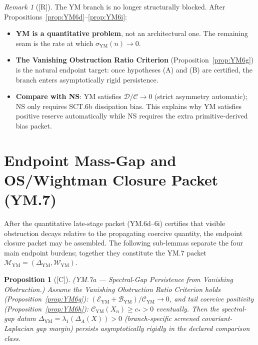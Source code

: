 \documentclass[12pt,oneside]{amsbook}
\theoremstyle{plain}
\newtheorem{proposition}[theorem]{Proposition}
\theoremstyle{definition}
\theoremstyle{remark}
\newtheorem{remark}[theorem]{Remark}
\newcommand{\status}[1]{\textup{[#1]}}
\begin{document}
\begin{remark}[\status{R}]\label{rem:YM-quantitative-summary}
The YM branch is no longer structurally blocked. After
Propositions~\ref{prop:YM6d}--\ref{prop:YM6i}:
\begin{itemize}
 \item \textbf{YM is a quantitative problem}, not an architectural
 one. The remaining seam is the rate at which
 $\sigma_{\mathrm{YM}}(n) \to 0$.
 \item \textbf{The Vanishing Obstruction Ratio Criterion}
 (Proposition~\ref{prop:YM6g}) is the natural endpoint target:
 once hypotheses (A) and (B) are certified, the branch enters
 asymptotically rigid persistence.
 \item \textbf{Compare with NS}: YM satisfies
 $\mathcal{D}/\mathcal{C} \to 0$ (strict asymmetry automatic);
 NS only requires SCT.6b dissipation bias. This explains why YM
 satisfies positive reserve automatically while NS requires the
 extra primitive-derived bias packet.
\end{itemize}
\end{remark}

\section{Endpoint Mass-Gap and OS/Wightman Closure Packet (YM.7)}
\label{sec:YM-endpoint}

After the quantitative late-stage packet (YM.6d--6i) certifies that
visible obstruction decays relative to the propagating coercive
quantity, the endpoint closure packet may be assembled. The following
sub-lemmas separate the four main endpoint burdens; together they
constitute the YM.7 packet
$\mathcal{M}_{\mathrm{YM}} = (\Delta_{\mathrm{YM}}, \mathcal{W}_{\mathrm{YM}})$.

\begin{proposition}[\status{C}]\label{prop:YM7a}
\textup{(YM.7a --- Spectral-Gap Persistence from Vanishing Obstruction.)}
Assume the Vanishing Obstruction Ratio Criterion holds
(Proposition~\ref{prop:YM6g}): $(\mathcal{E}_{\mathrm{YM}} +
\mathcal{B}_{\mathrm{YM}})/\mathcal{C}_{\mathrm{YM}} \to 0$, and
tail coercive positivity (Proposition~\ref{prop:YM6h}):
$\mathcal{C}_{\mathrm{YM}}(X_n) \geq c_* > 0$ eventually.
Then the spectral-gap datum
$\Delta_{\mathrm{YM}} = \lambda_1(\Delta_A(X)) > 0$
(branch-specific screened covariant-Laplacian gap margin)
persists asymptotically rigidly in the declared comparison class.
\end{proposition}
\end{document}

